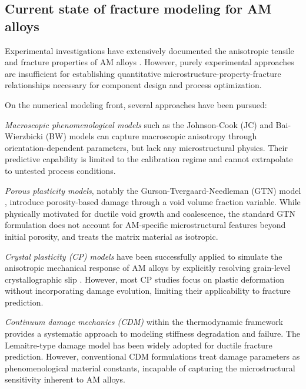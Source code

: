\documentclass[12pt,a4paper,twocolumn]{article}
\begin{document}
\subsection{Current state of fracture modeling for AM alloys}

Experimental investigations have extensively documented the anisotropic tensile and fracture properties of AM alloys \cite{simonelli2014formation,leuders2013mechanical,wen2019damage}. However, purely experimental approaches are insufficient for establishing quantitative microstructure-property-fracture relationships necessary for component design and process optimization.

On the numerical modeling front, several approaches have been pursued:

\textit{Macroscopic phenomenological models} such as the Johnson-Cook (JC) \cite{johnson1985fracture} and Bai-Wierzbicki (BW) \cite{bai2008new} models can capture macroscopic anisotropy through orientation-dependent parameters, but lack any microstructural physics. Their predictive capability is limited to the calibration regime and cannot extrapolate to untested process conditions.

\textit{Porous plasticity models}, notably the Gurson-Tvergaard-Needleman (GTN) model \cite{gurson1977continuum,tvergaard1984analysis}, introduce porosity-based damage through a void volume fraction variable. While physically motivated for ductile void growth and coalescence, the standard GTN formulation does not account for AM-specific microstructural features beyond initial porosity, and treats the matrix material as isotropic.

\textit{Crystal plasticity (CP) models} have been successfully applied to simulate the anisotropic mechanical response of AM alloys by explicitly resolving grain-level crystallographic slip \cite{zhang2018crystal,liu2020crystal,kapoor2021modeling}. However, most CP studies focus on plastic deformation without incorporating damage evolution, limiting their applicability to fracture prediction.

\textit{Continuum damage mechanics (CDM)} within the thermodynamic framework \cite{lemaitre1992course,chaboche1988continuum} provides a systematic approach to modeling stiffness degradation and failure. The Lemaitre-type damage model \cite{lemaitre1985continuous} has been widely adopted for ductile fracture prediction. However, conventional CDM formulations treat damage parameters as phenomenological material constants, incapable of capturing the microstructural sensitivity inherent to AM alloys.
\end{document}

